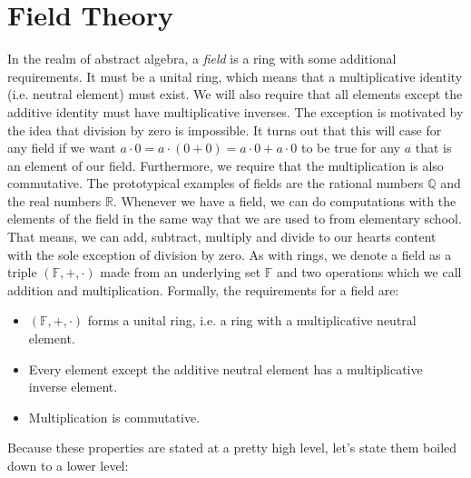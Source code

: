 \section{Field Theory}
In the realm of abstract algebra, a \emph{field} is a ring with some additional requirements. It must be a unital ring, which means that a multiplicative identity (i.e. neutral element) must exist. We will also require that all elements except the additive identity must have multiplicative inverses. The exception is motivated by the idea that division by zero is impossible. It turns out that this will case for any field if we want $a \cdot 0 = a \cdot (0 + 0) = a \cdot 0 + a \cdot 0$ to be true for any $a$ that is an element of our field. Furthermore, we require that the multiplication is also commutative. The prototypical examples of fields are the rational numbers $\mathbb{Q}$ and the real numbers $\mathbb{R}$. Whenever we have a field, we can do computations with the elements of the field in the same way that we are used to from elementary school. That means, we can add, subtract, multiply and divide to our hearts content with the sole exception of division by zero. As with rings, we denote a field as a triple $(\mathbb{F}, +, \cdot)$ made from an underlying set $\mathbb{F}$ and two operations which we call addition and multiplication. Formally, the requirements for a field are:
\begin{itemize}
\item $(\mathbb{F},+,\cdot)$ forms a unital ring, i.e. a ring with a multiplicative neutral element.
\item Every element except the additive neutral element has a multiplicative inverse element.
\item Multiplication is commutative.
\end{itemize}
Because these properties are stated at a pretty high level, let's state them boiled down to a lower level:

